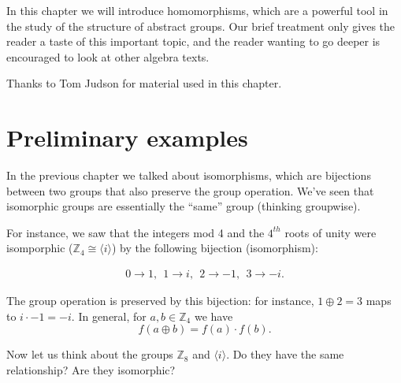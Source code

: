



In this chapter we will introduce homomorphisms, which are a powerful tool in the study of the structure of abstract groups. Our brief treatment only gives the reader a taste of this important topic, and the reader wanting to go deeper is encouraged to look at other algebra texts.
\bigskip

Thanks to Tom Judson for material used in this chapter.
 
\section{Preliminary examples}\label{homomorph_defn_ex}

  
In the previous chapter we talked about isomorphisms, which are bijections between two groups that also preserve
the group operation. We've seen that isomorphic groups are essentially the ``same'' group (thinking groupwise). 

For instance, we saw that the integers mod 4 and the $4^{th}$ roots of unity were isomporphic (${\mathbb Z_4} \cong \langle i \rangle$)  by the following bijection (isomorphism):

\begin{align*}
    0 \rightarrow 1 ,~~     1 \rightarrow i,~~    2 \rightarrow -1,~~   3 \rightarrow -i.
\end{align*}

The group operation is preserved by this bijection:  for instance, $1  \oplus 2=3$ maps to 
$i \cdot -1 = -i$.
In general, for $a,b \in {\mathbb Z_4}$ we have
$$f(a \oplus b) = f(a) \cdot f(b).$$

 Now let us think about the groups \emph{ ${\mathbb Z_8}$} and $\langle i \rangle$.  Do they have the same relationship?  Are they isomorphic? 

